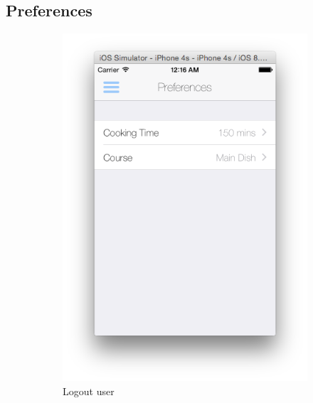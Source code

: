 \subsection{Preferences} 
	  \begin{figure}[h]
	  	\begin{subfigure}{.32\textwidth}
	  		\includegraphics[width=.9\linewidth]{figures/ch4_app_screen_shots/preferences/peferences.png}
	  		\caption{Logout user}
	  	\end{subfigure}
	  	\begin{subfigure}{.32\textwidth}

\end{subfigure}
\end{figure}
